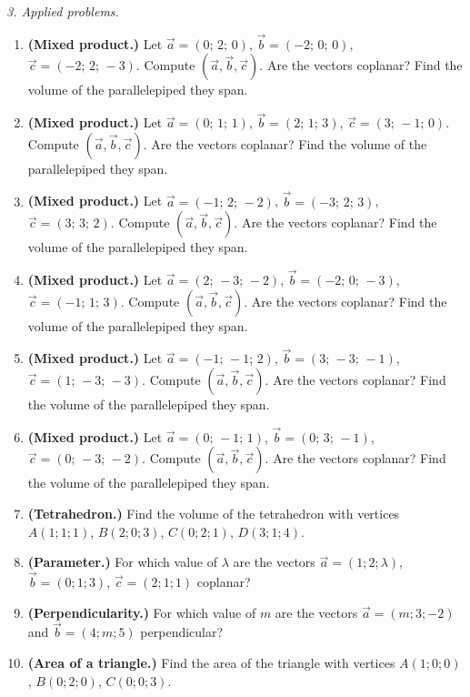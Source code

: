 \emph{3. Applied problems.}
\bigskip
\begin{enumerate}[label=\arabic*., leftmargin=*]
\item \textbf{(Mixed product.)} Let $\vec a=(0;\,2;\,0)$, $\vec b=(-2;\,0;\,0)$, $\vec c=(-2;\,2;\,-3)$. Compute $(\vec a,\vec b,\vec c)$. Are the vectors coplanar? Find the volume of the parallelepiped they span.
\item \textbf{(Mixed product.)} Let $\vec a=(0;\,1;\,1)$, $\vec b=(2;\,1;\,3)$, $\vec c=(3;\,-1;\,0)$. Compute $(\vec a,\vec b,\vec c)$. Are the vectors coplanar? Find the volume of the parallelepiped they span.
\item \textbf{(Mixed product.)} Let $\vec a=(-1;\,2;\,-2)$, $\vec b=(-3;\,2;\,3)$, $\vec c=(3;\,3;\,2)$. Compute $(\vec a,\vec b,\vec c)$. Are the vectors coplanar? Find the volume of the parallelepiped they span.
\item \textbf{(Mixed product.)} Let $\vec a=(2;\,-3;\,-2)$, $\vec b=(-2;\,0;\,-3)$, $\vec c=(-1;\,1;\,3)$. Compute $(\vec a,\vec b,\vec c)$. Are the vectors coplanar? Find the volume of the parallelepiped they span.
\item \textbf{(Mixed product.)} Let $\vec a=(-1;\,-1;\,2)$, $\vec b=(3;\,-3;\,-1)$, $\vec c=(1;\,-3;\,-3)$. Compute $(\vec a,\vec b,\vec c)$. Are the vectors coplanar? Find the volume of the parallelepiped they span.
\item \textbf{(Mixed product.)} Let $\vec a=(0;\,-1;\,1)$, $\vec b=(0;\,3;\,-1)$, $\vec c=(0;\,-3;\,-2)$. Compute $(\vec a,\vec b,\vec c)$. Are the vectors coplanar? Find the volume of the parallelepiped they span.
\item \textbf{(Tetrahedron.)} Find the volume of the tetrahedron with vertices $A(1;1;1)$, $B(2;0;3)$, $C(0;2;1)$, $D(3;1;4)$.
\item \textbf{(Parameter.)} For which value of $\lambda$ are the vectors $\vec a=(1;2;\lambda)$, $\vec b=(0;1;3)$, $\vec c=(2;1;1)$ coplanar?
\item \textbf{(Perpendicularity.)} For which value of $m$ are the vectors $\vec a=(m;3;-2)$ and $\vec b=(4;m;5)$ perpendicular?
\item \textbf{(Area of a triangle.)} Find the area of the triangle with vertices $A(1;0;0)$, $B(0;2;0)$, $C(0;0;3)$.
\end{enumerate}

